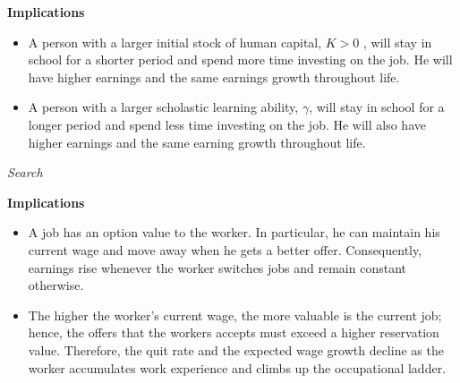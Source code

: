 \begin{frame}\textbf{Implications}\vspace{0.3cm}

\begin{itemize}\setlength\itemsep{1em}
\item A person with a larger initial stock of human capital, $K > 0$ , will stay in school for a shorter period and spend more time investing on the job. He will have higher earnings and the same earnings growth throughout life.
\item A person with a larger scholastic learning ability, $\gamma$, will stay in school for a longer period and spend less time investing on the job. He will also have higher earnings and the same earning growth throughout life.
\end{itemize}

\end{frame}
\begin{frame}\begin{center}
	\LARGE\textit{Search}
\end{center}\end{frame}
\begin{frame}\textbf{Implications}\vspace{0.3cm}

\begin{itemize}\setlength\itemsep{1em}
\item A job has an option value to the worker. In particular, he can maintain his current wage and move away when he gets a better offer. Consequently, earnings rise whenever the worker switches jobs and remain constant otherwise.
\item The higher the worker's current wage, the more valuable is the current job; hence, the offers that the workers accepts must exceed a higher reservation value. Therefore, the quit rate and the expected wage growth decline as the worker accumulates work experience and climbs up the occupational ladder.
\end{itemize}

\end{frame}
